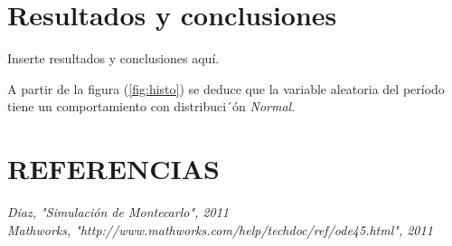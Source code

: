 \documentclass{SPANISH_acm_proc_article-sp}
\begin{document}
\section{Resultados y conclusiones}
\label{sec:resultados}
Inserte resultados y conclusiones aqu\'i.

A partir de la figura (\ref{fig:histo}) se deduce que la variable aleatoria del per\'iodo tiene un comportamiento con distribuci´\'on \textit{Normal}. 

\section*{REFERENCIAS}
\textit{Diaz, "Simulaci\'on de Montecarlo", 2011} \\
\textit{Mathworks, "http://www.mathworks.com/help/techdoc/ref/ode45.html", 2011}
\end{document}
